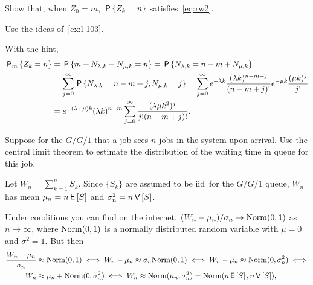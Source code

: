\begin{exercise}\label{ex:l-134}
 Show that, when $Z_0=m$,  $\P{Z_k=n}$ satisfies~\cref{eq:rw2}.
 \begin{hint}
Use the ideas of~\cref{ex:l-103}.
 \end{hint}
\begin{solution}
With the hint,
\begin{align*}
 \PP{m}{Z_k=n}
&= \P{m+N_{\lambda, k } - N_{\mu, k} = n }
= \P{N_{\lambda, k} = n - m + N_{\mu, k}} \\
&= \sum_{j=0}^\infty \P{N_{\lambda, k}  =  n - m + j, N_{\mu, k} =j}
= \sum_{j=0}^\infty e^{-\lambda k} \frac{(\lambda k )^{n - m + j}}{(n-m+j)!} e^{-\mu k} \frac{(\mu k )^j}{j!} \\
&= e^{-(\lambda+\mu)k} (\lambda k)^{n-m} \sum_{j=0}^\infty  \frac{(\lambda\mu k^2)^j} {j!(n-m+j)!}.
\end{align*}
\end{solution}
\end{exercise}




\begin{exercise}\label{ex:l-147}
 Suppose
 for the $G/G/1$ that a job sees $n$ jobs in the system upon arrival.
 Use the central limit theorem to estimate the distribution of the waiting time in queue for this job.
\begin{hint}
 Let $W_{n} = \sum_{k=1}^n S_k$.
 Since $\{S_k\}$ are assumed to be iid\ for the $G/G/1$ queue, $W_{n}$ has mean $\mu_n = n \E S$ and $\sigma_n^2 = n\V S$.
\end{hint}
\begin{solution} Under conditions you can find on the internet, $(W_{n} - \mu_n)/\sigma_n \to \Norm{0,1}$ as $n\to \infty$,
 where $\Norm{0,1}$ is a normally distributed random variable
 with $\mu=0$ and $\sigma^2=1$. But then
 \begin{align*}
 \frac{\W_{n} - \mu_n}{\sigma_n} &\approx \Norm{0,1} \iff  W_{n} - \mu_n \approx \sigma_n \Norm{0,1} \iff
 W_{n} - \mu_n \approx \Norm{0,\sigma_n^2} \iff \\
 W_{n} &\approx \mu_n + \Norm{0,\sigma_n^2} \iff
 W_{n} \approx \Norm{\mu_n,\sigma_n^2} = \Norm{n\E S, n \V S},
 \end{align*}
\end{solution}
\end{exercise}




